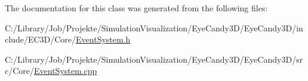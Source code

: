 The documentation for this class was generated from the following files\+:\begin{DoxyCompactItemize}
\item 
C\+:/\+Library/\+Job/\+Projekte/\+Simulation\+Visualization/\+Eye\+Candy3\+D/\+Eye\+Candy3\+D/include/\+E\+C3\+D/\+Core/\mbox{\hyperlink{_event_system_8h}{Event\+System.\+h}}\item 
C\+:/\+Library/\+Job/\+Projekte/\+Simulation\+Visualization/\+Eye\+Candy3\+D/\+Eye\+Candy3\+D/src/\+Core/\mbox{\hyperlink{_event_system_8cpp}{Event\+System.\+cpp}}\end{DoxyCompactItemize}
